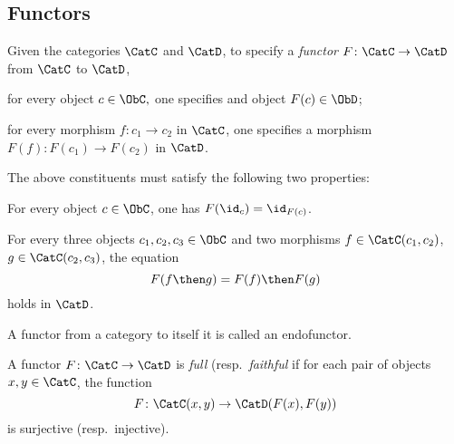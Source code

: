 \subsection{Functors}
\begin{shaded}
\begin{definition}[Functor]
\label{def:functor}
Given the categories $\CatC$ and $\CatD$, to specify a \emph{functor} $F\colon \CatC\to \CatD$ from $\CatC$ to $\CatD$,
\begin{compactenum}
    \item for every object $c\in \ObC,$ one specifies and object $F(c)\in \ObD$;
    \item for every morphism $f\colon c_1\to c_2$ in $\CatC$, one specifies a morphism $F(f)\colon F(c_1)\to F(c_2)$ in $\CatD$.
\end{compactenum}
The above constituents must satisfy the following two properties:
\begin{compactenum}[(a)]
    \item For every object $c\in \ObC$, one has $F(\id_c)=\id_{F(c)}$.
    \item For every three objects $c_1,c_2,c_3 \in \ObC$ and two morphisms $f\in \CatC(c_1,c_2)$, $g\in \CatC(c_2,c_3)$, the equation 
    \begin{equation}
        F(f\then g)=F(f)\then F(g)
    \end{equation}
holds in $\CatD$.
\end{compactenum}
\end{definition}

\begin{remark}
A functor from a category to itself it is called an endofunctor.
\end{remark}

\begin{definition}
\label{def:functorfullfaith}
A functor $F\colon \CatC \to \CatD$ is \emph{full} (resp.\ \emph{faithful} if for each pair of objects $x,y\in \CatC$, the function
\begin{equation}
    F\colon \CatC(x,y)\to \CatD(F(x),F(y))
\end{equation}
is surjective (resp.\ injective).
\end{definition}
\end{shaded}

